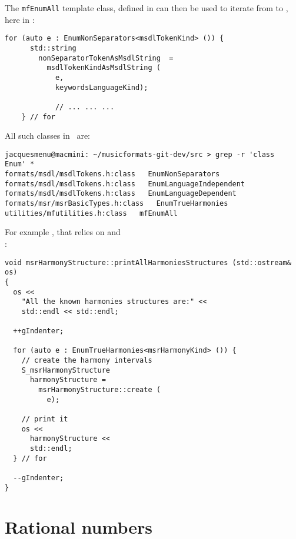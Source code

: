 The {\tt mfEnumAll} template class, defined in  can then be used to iterate from  to , here in :
\begin{lstlisting}[language=CPlusPlus]
    for (auto e : EnumNonSeparators<msdlTokenKind> ()) {
      std::string
        nonSeparatorTokenAsMsdlString  =
          msdlTokenKindAsMsdlString (
            e,
            keywordsLanguageKind);

			// ... ... ...
    } // for
\end{lstlisting}

All such  classes in \mf\ are:
\begin{lstlisting}[language=Terminal]
jacquesmenu@macmini: ~/musicformats-git-dev/src > grep -r 'class   Enum' *
formats/msdl/msdlTokens.h:class   EnumNonSeparators
formats/msdl/msdlTokens.h:class   EnumLanguageIndependent
formats/msdl/msdlTokens.h:class   EnumLanguageDependent
formats/msr/msrBasicTypes.h:class   EnumTrueHarmonies
utilities/mfutilities.h:class   mfEnumAll
\end{lstlisting}

For example , that relies on  and\\
 :
\begin{lstlisting}[language=CPlusPlus]
void msrHarmonyStructure::printAllHarmoniesStructures (std::ostream& os)
{
  os <<
    "All the known harmonies structures are:" <<
    std::endl << std::endl;

  ++gIndenter;

  for (auto e : EnumTrueHarmonies<msrHarmonyKind> ()) {
    // create the harmony intervals
    S_msrHarmonyStructure
      harmonyStructure =
        msrHarmonyStructure::create (
          e);

    // print it
    os <<
      harmonyStructure <<
      std::endl;
  } // for

  --gIndenter;
}
\end{lstlisting}


\section{Rational numbers}

